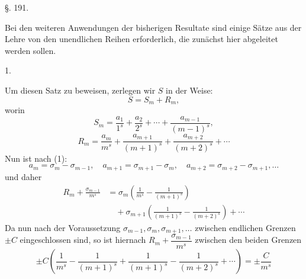 \begin{center}
§. 191.

\end{center}

Bei den weiteren Anwendungen der bisherigen Resultate sind einige Sätze aus der Lehre von den unendlichen Reihen erforderlich, die zunächst hier abgeleitet werden sollen.

1. 





Um diesen Satz zu beweisen, zerlegen wir $S$ in der Weise:
\[
S = S_m+R_m,
\]
worin
\[
S_m = \frac{a_1}{1^s}+\frac{a_2}{2^s}+\cdots+\frac{a_{m-1}}{(m-1)^s},
\]
\[
R_m = \frac{a_m}{m^s}+\frac{a_{m+1}}{(m+1)^s}+\frac{a_{m+2}}{(m+2)^s}+\cdots
\]
Nun ist nach (1):
\[
a_m = \sigma_m-\sigma_{m-1}, \quad a_{m+1}=\sigma_{m+1}-\sigma_m, \quad a_{m+2}=\sigma_{m+2}-\sigma_{m+1}, \ldots
\]
und daher
\[
\begin{aligned}
R_m+\frac{\sigma_{m-1}}{m^s}
&= \sigma_m\left(\frac{1}{m^s}-\frac{1}{(m+1)^s}\right) \\
&\quad +\sigma_{m+1}\left(\frac{1}{(m+1)^s}-\frac{1}{(m+2)^s}\right)+\cdots
\end{aligned}
\]
Da nun nach der Voraussetzung $\sigma_{m-1}, \sigma_m, \sigma_{m+1}, \ldots$ zwischen endlichen Grenzen $\pm C$ eingeschlossen sind, so ist hiernach $R_m+\dfrac{\sigma_{m-1}}{m^s}$ zwischen den beiden Grenzen
\[
\pm C\left(\frac{1}{m^s}-\frac{1}{(m+1)^s}+\frac{1}{(m+1)^s}-\frac{1}{(m+2)^s}+\cdots\right) = \pm\frac{C}{m^s}
\]
